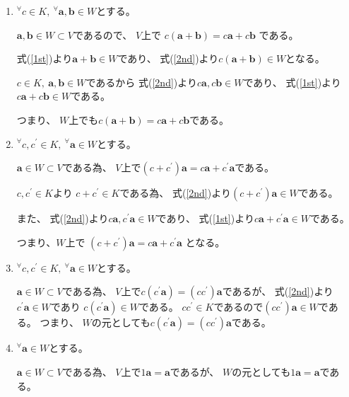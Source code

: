 \documentclass[12pt,b5paper]{ltjsarticle}
\begin{document}
\begin{enumerate}
 \item
      ${}^{\forall}c\in K,\ {}^{\forall}\bm{a},\bm{b}\in W$とする。

      $\bm{a},\bm{b}\in W \subset V$であるので、
      $V$上で
      $c(\bm{a}+\bm{b})=c\bm{a}+c\bm{b}$
      である。

      式(\ref{1st})より$\bm{a}+\bm{b}\in W$であり、
      式(\ref{2nd})より$c(\bm{a}+\bm{b})\in W$となる。

      $c\in K,\ \bm{a},\bm{b}\in W$であるから
      式(\ref{2nd})より$c\bm{a},c\bm{b}\in W$であり、
      式(\ref{1st})より$c\bm{a}+c\bm{b}\in W$である。

      つまり、
      $W$上でも$c(\bm{a}+\bm{b})=c\bm{a}+c\bm{b}$である。

 \item \label{axa}
      ${}^{\forall}c,c^{\prime}\in K,\ {}^{\forall}\bm{a}\in W$とする。

      $\bm{a}\in W \subset V$である為、
      $V$上で$(c+c^\prime)\bm{a}=c\bm{a}+c^\prime\bm{a}$である。
      
      $c,c^{\prime}\in K$より
      $c+c^{\prime}\in K$である為、
      式(\ref{2nd})より$(c+c^\prime)\bm{a}\in W$である。

      また、
      式(\ref{2nd})より$c\bm{a}, c^\prime\bm{a}\in W$であり、
      式(\ref{1st})より$c\bm{a}+c^\prime\bm{a}\in W$である。
      
      つまり、$W$上で
      $(c+c^\prime)\bm{a}=c\bm{a}+c^\prime\bm{a}$
      となる。

 \item
      ${}^{\forall}c,c^\prime\in K,\ {}^{\forall}\bm{a}\in W$とする。

      $\bm{a}\in W \subset V$である為、
      $V$上で$c(c^\prime\bm{a})=(cc^\prime)\bm{a}$であるが、
      式(\ref{2nd})より$c^\prime\bm{a}\in W$であり
      $c(c^\prime\bm{a})\in W$である。
      $cc^\prime \in K$であるので$(cc^\prime)\bm{a}\in W$である。
      つまり、
      $W$の元としても$c(c^\prime\bm{a})=(cc^\prime)\bm{a}$である。

 \item\label{axb}
      ${}^{\forall}\bm{a}\in W$とする。

      $\bm{a}\in W \subset V$である為、
      $V$上で$1\bm{a}=\bm{a}$であるが、
      $W$の元としても$1\bm{a}=\bm{a}$である。

\end{enumerate}
\end{document}
